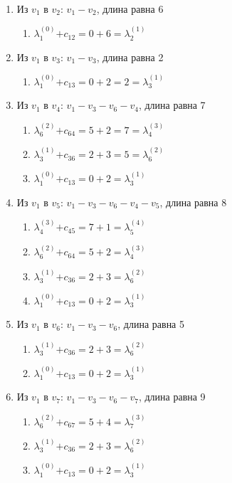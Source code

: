 \documentclass{article}
\newcommand\ld[2]{$\lambda^{(#1)}_{#2}$}
\begin{document}
\newpage
\\\\\\
\begin{enumerate}
    \item Из $v_1$ в $v_2$: $v_1 - v_2$, длина равна 6
    \begin{enumerate}
        \item \ld{0}{1}$+ c_{12} = 0 + 6 =$\ld{1}{2}
    \end{enumerate}
    
    \item Из $v_1$ в $v_3$: $v_1 - v_3$, длина равна 2
    \begin{enumerate}
        \item \ld{0}{1}$+ c_{13} = 0 + 2 = 2 =$\ld{1}{3}
    \end{enumerate}
    
    \item Из $v_1$ в $v_4$: $v_1 - v_3 - v_6 - v_4$, длина равна 7
    \begin{enumerate}
        \item \ld{2}{6}$+ c_{64} = 5 + 2 = 7 =$\ld{3}{4}
        \item \ld{1}{3}$+ c_{36} = 2 + 3 = 5 =$\ld{2}{6}
        \item \ld{0}{1}$+ c_{13} = 0 + 2 =$\ld{1}{3}
    \end{enumerate}

    \item Из $v_1$ в $v_5$: $v_1 - v_3 - v_6 - v_4 - v_5$, длина равна 8
    \begin{enumerate}
        \item \ld{3}{4}$+ c_{45} = 7 + 1 =$\ld{4}{5}
        \item \ld{2}{6}$+ c_{64} = 5 + 2 =$\ld{3}{4}
        \item \ld{1}{3}$+ c_{36} = 2 + 3 =$\ld{2}{6}
        \item \ld{0}{1}$+ c_{13} = 0 + 2 =$\ld{1}{3}
    \end{enumerate}

    \item Из $v_1$ в $v_6$: $v_1 - v_3 - v_6$, длина равна 5
    \begin{enumerate}
        \item \ld{1}{3}$+ c_{36} = 2 + 3 =$\ld{2}{6}
        \item \ld{0}{1}$+ c_{13} = 0 + 2 =$\ld{1}{3}
    \end{enumerate}

    \item Из $v_1$ в $v_7$: $v_1 - v_3 - v_6 - v_7$, длина равна 9
    \begin{enumerate}
        \item \ld{2}{6}$+ c_{67} = 5 + 4 =$\ld{3}{7}
        \item \ld{1}{3}$+ c_{36} = 2 + 3 =$\ld{2}{6}
        \item \ld{0}{1}$+ c_{13} = 0 + 2 =$\ld{1}{3}
    \end{enumerate}

\end{enumerate}
\end{document}
